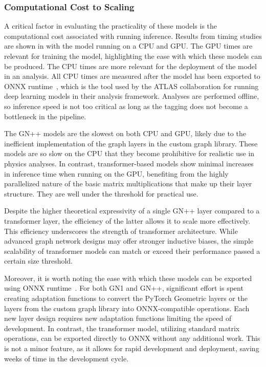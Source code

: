 \FloatBarrier

\subsubsection{Computational Cost to Scaling}

A critical factor in evaluating the practicality of these models is the computational cost associated with running inference.
Results from timing studies are shown in  with the model running on a CPU and GPU\@.
The GPU times are relevant for training the model, highlighting the ease with which these models can be produced.
The CPU times are more relevant for the deployment of the model in an analysis.
All CPU times are measured after the model has been exported to ONNX runtime~\cite{onnxruntime}, which is the tool used by the ATLAS collaboration for running deep learning models in their analysis framework.
Analyses are performed offline, so inference speed is not too critical as long as the tagging does not become a bottleneck in the pipeline.

The GN++ models are the slowest on both CPU and GPU, likely due to the inefficient implementation of the graph layers in the custom graph library.
These models are so slow on the CPU that they become prohibitive for realistic use in physics analyses.
In contrast, transformer-based models show minimal increases in inference time when running on the GPU, benefiting from the highly parallelized nature of the basic matrix multiplications that make up their layer structure.
They are well under the threshold for practical use.

Despite the higher theoretical expressivity of a single GN++ layer compared to a transformer layer, the efficiency of the latter allows it to scale more effectively.
This efficiency underscores the strength of transformer architecture.
While advanced graph network designs may offer stronger inductive biases, the simple scalability of transformer models can match or exceed their performance passed a certain size threshold.

Moreover, it is worth noting the ease with which these models can be exported using ONNX runtime~\cite{onnxruntime}.
For both GN1 and GN++, significant effort is spent creating adaptation functions to convert the PyTorch Geometric layers or the layers from the custom graph library into ONNX-compatible operations.
Each new layer design requires new adaptation functions limiting the speed of development.
In contrast, the transformer model, utilizing standard matrix operations, can be exported directly to ONNX without any additional work.
This is not a minor feature, as it allows for rapid development and deployment, saving weeks of time in the development cycle.

